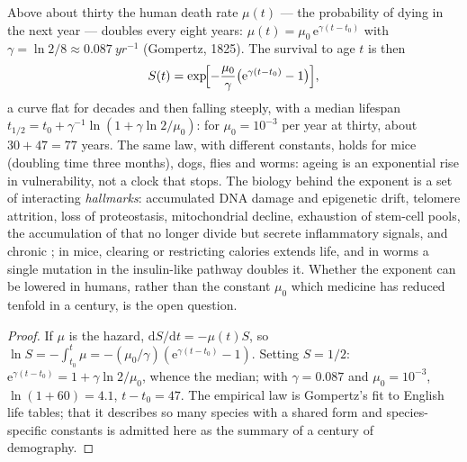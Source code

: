\begin{proposition}\label{prop:b3:stem-cells:gompertz}
Above about thirty the human death rate $\mu(t)$ --- the probability
of dying in the next year --- doubles every eight years: $\mu(t) =
\mu_{0}\,\mathrm{e}^{\gamma(t - t_{0})}$ with $\gamma = \ln 2/8 \approx
\qty{0.087}{yr^{-1}}$ (Gompertz, 1825). The survival to age $t$ is then
\[
S(t) = \exp\!\Bigl[-\frac{\mu_{0}}{\gamma}\bigl(\mathrm{e}^{\gamma(t - t_{0})} - 1\bigr)\Bigr],
\]
a curve flat for decades and then falling steeply, with a median
lifespan $t_{1/2} = t_{0} + \gamma^{-1}\ln(1 + \gamma\ln 2/\mu_{0})$:
for $\mu_{0} = 10^{-3}$ per year at thirty, about $30 + 47 = 77$ years.
The same law, with different constants, holds for mice (doubling time
three months), dogs, flies and worms: ageing is an exponential rise in
vulnerability, not a clock that stops. The biology behind the exponent
is a set of interacting \emph{hallmarks}: accumulated DNA damage and
epigenetic drift, telomere attrition, loss of proteostasis,
mitochondrial decline, exhaustion of stem-cell pools, the accumulation
of \emph{} that no longer divide but secrete
inflammatory signals, and chronic ; in mice, clearing
 or restricting calories extends life, and in worms a
single mutation in the insulin-like pathway doubles it. Whether the
exponent can be lowered in humans, rather than the constant $\mu_{0}$
which medicine has reduced tenfold in a century, is the open question.
\end{proposition}
\begin{proof}
If $\mu$ is the hazard, $\mathrm{d}S/\mathrm{d}t = -\mu(t)S$, so $\ln S =
-\int_{t_{0}}^{t}\mu = -(\mu_{0}/\gamma)(\mathrm{e}^{\gamma(t-t_{0})} -
1)$. Setting $S = 1/2$: $\mathrm{e}^{\gamma(t-t_{0})} = 1 + \gamma\ln 2/
\mu_{0}$, whence the median; with $\gamma = 0.087$ and $\mu_{0} =
10^{-3}$, $\ln(1 + 60) = 4.1$, $t - t_{0} = 47$. The empirical law is
Gompertz's fit to English life tables; that it describes so many
species with a shared form and species-specific constants is admitted
here as the summary of a century of demography.
\end{proof}

